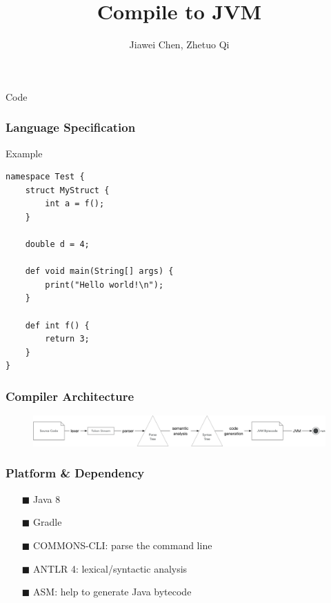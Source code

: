 \documentclass{beamer}
\begin{document}
\title{Compile to JVM}
\author{Jiawei Chen, Zhetuo Qi}
\begin{frame}
    \maketitle
\end{frame}

\begin{frame}[fragile]{Code}
    \frametitle{Language Specification}
    \begin{block}{Example}
        \begin{lstlisting}[firstnumber=1, label=glabels, xleftmargin=10pt] 
namespace Test {
    struct MyStruct {
        int a = f();
    }

    double d = 4;

    def void main(String[] args) {
        print("Hello world!\n");
    }

    def int f() {
        return 3;
    }
}
        \end{lstlisting}
    \end{block}
\end{frame}

\begin{frame}
    \frametitle{Compiler Architecture}
    \begin{figure}[h]
        \centering
        \includegraphics[scale=0.28]{assets/architecture.png}    
    \end{figure}
\end{frame}

\begin{frame}
    \frametitle{Platform \& Dependency}

    \begin{itemize}
        \item[$\blacksquare$] Java 8
        \item[$\blacksquare$] Gradle
        \item[$\blacksquare$] COMMONS-CLI: parse the command line
        \item[$\blacksquare$] ANTLR 4: lexical/syntactic analysis
        \item[$\blacksquare$] ASM: help to generate Java bytecode
    \end{itemize}
\end{frame}
\end{document}
